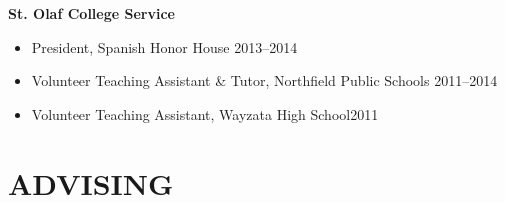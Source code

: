 \documentclass[margin]{res}
\begin{document}
\begin{resume}
\textbf{St. Olaf College Service}
\begin{itemize}
			\item President, Spanish Honor House \hfill 2013--2014
			\item Volunteer Teaching Assistant \& Tutor, Northfield Public Schools \hfill 2011--2014
			\item Volunteer Teaching Assistant, Wayzata High School\hfill 2011 \\
\end{itemize}
						

	
	
\section{ADVISING}	





\end{resume}
\end{document}
